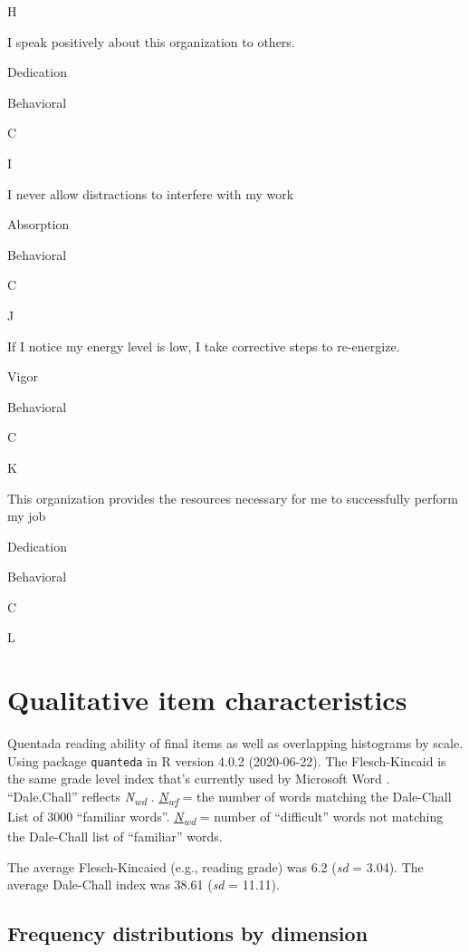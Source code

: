 \documentclass[
]{book}
\begin{document}
H

I speak positively about this organization to others.

Dedication

Behavioral

C

I

I never allow distractions to interfere with my work

Absorption

Behavioral

C

J

If I notice my energy level is low, I take corrective steps to re-energize.

Vigor

Behavioral

C

K

This organization provides the resources necessary for me to successfully perform my job

Dedication

Behavioral

C

L

\hypertarget{qualitative-item-characteristics}{%
\chapter{Qualitative item characteristics}\label{qualitative-item-characteristics}}

Quentada reading ability of final items as well as overlapping histograms by scale. Using package \texttt{quanteda} in R version 4.0.2 (2020-06-22). The Flesch-Kincaid is the same grade level index that's currently used by Microsoft Word \citep{kincaid_derivation_1975}. ``Dale.Chall'' reflects \emph{N\textsubscript{wd}} \citep[``difficulty'' of words;][]{chall_dale_1995}. \href{https://quanteda.io/reference/textstat_readability.html}{\emph{N\textsubscript{wf}}} = the number of words matching the Dale-Chall List of 3000 ``familiar words''. \href{https://quanteda.io/reference/textstat_readability.html}{\emph{N\textsubscript{wd}}} = number of ``difficult'' words not matching the Dale-Chall list of ``familiar'' words.

The average Flesch-Kincaied (e.g., reading grade) was 6.2 (\emph{sd} = 3.04). The average Dale-Chall index was 38.61 (\emph{sd} = 11.11).

\hypertarget{frequency-distributions-by-dimension}{%
\section{Frequency distributions by dimension}\label{frequency-distributions-by-dimension}}
\end{document}
